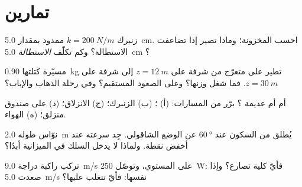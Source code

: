 \section{تمارين}

\begin{exercise}[$\star$]\label{exo:g12:work-and-energy:1}
زنبرك  $k = \qty{200}{N/m}$ ممدود بمقدار
\qty{5.0}{cm}. احسب  المخزونة؛ وماذا تصير إذا تضاعفت
الاستطالة؟ وكم تكلّف \emph{الاستطالة} \qty{5.0}{cm} ؟
\end{exercise}

\begin{exercise}[$\star$]\label{exo:g12:work-and-energy:2}
مسيّرة كتلتها \qty{0.90}{kg} تطير على  متعرّج من شرفة على
$z = \qty{12}{m}$ إلى شرفة على $z = \qty{30}{m}$. فما شغل
وزنها؟ وعلى الصعود المستقيم؟ وفي رحلة الذهاب والإياب؟
\end{exercise}

\begin{exercise}[$\star$]\label{exo:g12:work-and-energy:3}
 أم  أم عديمة ؟ برّر من المسارات:
(أ) ؛ (ب)  الزنبرك؛ (ج)  الانزلاق؛ (د)
 على صندوق منزلق؛ (ه)  الهواء.
\end{exercise}

\begin{exercise}[$\star$]\label{exo:g12:work-and-energy:4}
نوّاس طوله \qty{2.0}{m} يُطلق من السكون عند
$\qty{60}{\degree}$ عن الوضع الشاقولي. جِد سرعته عند أخفض
نقطة. ولماذا لا يدخل  السلك في الميزانية أبدًا؟
\end{exercise}

\begin{exercise}[$\star$]\label{exo:g12:work-and-energy:5}
تركب راكبة دراجة  \qty{9.0}{m/s} على المستوي، وتوصّل
\qty{250}{W}: فأيّ   كلية تصارع؟ وإذا صعدت 
\qty{5.0}{m/s}  نفسها: فأيّ  تتغلب عليها؟
\end{exercise}

